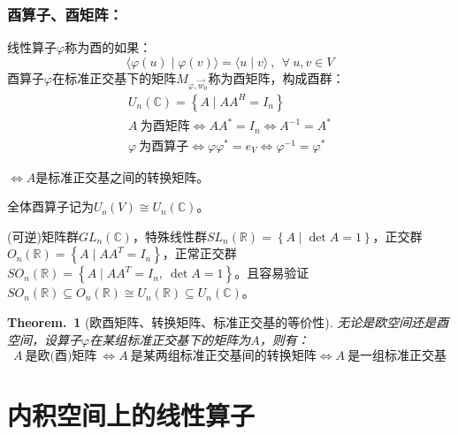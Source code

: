 \documentclass[zihao=-4,UTF8]{report}
\theoremstyle{mystyle} %
\newtheorem{theorem}{Theorem.\,}
\begin{document}
\subsubsection{酉算子、酉矩阵：}
线性算子$\varphi$称为酉的如果：
\begin{equation*}
    \langle \varphi(u) \mid \varphi(v) \rangle = \langle u \mid v \rangle\ ,\ \ \forall\ u,v \in V
\end{equation*}
酉算子$\varphi$在标准正交基下的矩阵$M_{\varphi,\vec{w}_0}$称为酉矩阵，构成酉群：
\begin{gather*}
    U_n(\mathbb{C})  = \left\{A\mid AA^H = I_n\right\}\\
    A\ \text{为酉矩阵} \Longleftrightarrow AA^*= I_n \Longleftrightarrow A^{-1} = A^* \\
    \varphi\ \text{为酉算子} \Longleftrightarrow \varphi\varphi^* = e_V \Longleftrightarrow \varphi^{-1} = \varphi^* 
\end{gather*}
{\par\color{gray}\small
$\Longleftrightarrow A$是标准正交基之间的转换矩阵。
\par}

全体酉算子记为$U_o(V) \cong U_n(\mathbb{C})$。
{\par\color{gray}\small
(可逆)矩阵群$GL_n(\mathbb{C})$，特殊线性群$SL_n(\mathbb{R}) = \left\{A\mid \det A = 1 \right\}$，正交群$O_n(\mathbb{R}) = \left\{ A\mid AA^T = I_n\right\}$，正常正交群$SO_n(\mathbb{R}) = \left\{ A\mid AA^T = I_n,\ \det A = 1\right\}$。且容易验证$SO_n(\mathbb{R}) \subseteq O_n(\mathbb{R}) \cong U_n(\mathbb{R}) \subseteq U_n(\mathbb{C}) $。
\par}
\begin{theorem}[欧酉矩阵、转换矩阵、标准正交基的等价性]\label{欧酉矩阵、转换矩阵、标准正交基的等价性}
    无论是欧空间还是酉空间，设算子$\varphi$在某组标准正交基下的矩阵为$A$，则有：
\begin{equation*}
    A\ \text{是欧(酉)矩阵}\ \Longleftrightarrow  A\ \text{是某两组标准正交基间的转换矩阵} \Longleftrightarrow  A\ \text{是一组标准正交基} 
\end{equation*}
\end{theorem}

\section{内积空间上的线性算子}
\end{document}
